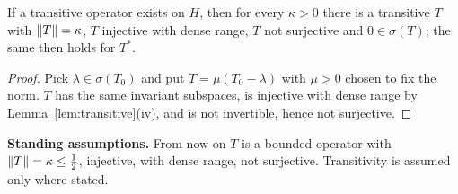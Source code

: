 \begin{corollary}\label{cor:normalise}\stproved{}
If a transitive operator exists on $H$, then for every $\kappa>0$ there is a transitive $T$ with
$\lVert T\rVert=\kappa$, $T$ injective with dense range, $T$ not surjective and $0\in\sigma(T)$; the same
then holds for $T^*$.
\end{corollary}
\begin{proof}
Pick $\lambda\in\sigma(T_0)$ and put $T=\mu(T_0-\lambda)$ with $\mu>0$ chosen to fix the norm. $T$
has the same invariant subspaces, is injective with dense range by
Lemma~\ref{lem:transitive}(iv), and is not invertible, hence not surjective.
\end{proof}

\noindent\textbf{Standing assumptions.} From now on $T$ is a bounded operator with
$\lVert T\rVert=\kappa\le\frac12$, injective, with dense range, not surjective. Transitivity is assumed
only where stated.
